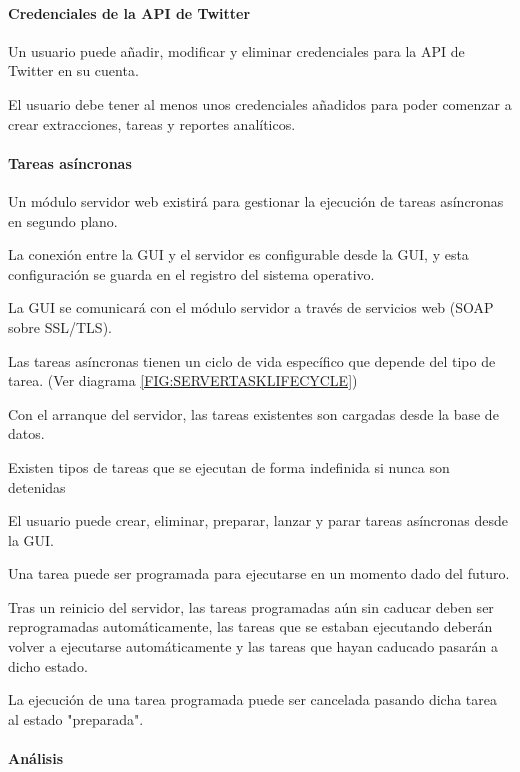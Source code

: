 \begin{functional}
\paragraph{Credenciales de la API de Twitter}

\item Un usuario puede añadir, modificar y eliminar credenciales para la API de Twitter en su cuenta.
\item El usuario debe tener al menos unos credenciales añadidos para poder comenzar a crear extracciones, tareas y reportes analíticos.

\paragraph{Tareas asíncronas}

\item Un módulo servidor web existirá para gestionar la ejecución de tareas asíncronas en segundo plano.
\item La conexión entre la GUI y el servidor es configurable desde la GUI, y esta configuración se guarda en el registro del sistema operativo. 
\item La GUI se comunicará con el módulo servidor a través de servicios web (SOAP sobre SSL/TLS).
\item Las tareas asíncronas tienen un ciclo de vida específico que depende del tipo de tarea. (Ver diagrama \ref{FIG:SERVERTASKLIFECYCLE})
\item Con el arranque del servidor, las tareas existentes son cargadas desde la base de datos.
\item Existen tipos de tareas que se ejecutan de forma indefinida si nunca son detenidas
\item El usuario puede crear, eliminar, preparar, lanzar y parar tareas asíncronas desde la GUI.
\item Una tarea puede ser programada para ejecutarse en un momento dado del futuro.
\item Tras un reinicio del servidor, las tareas programadas aún sin caducar deben ser reprogramadas automáticamente, las tareas que se estaban ejecutando deberán volver a ejecutarse automáticamente y las tareas que hayan caducado pasarán a dicho estado.
\item La ejecución de una tarea programada puede ser cancelada pasando dicha tarea al estado "preparada".

\paragraph{Análisis}


\end{functional}
